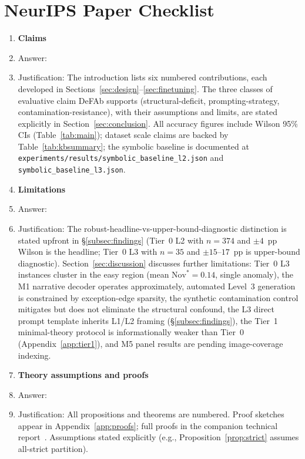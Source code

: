 \documentclass{article}
\theoremstyle{definition}
\newcommand{\Nov}{\mathrm{Nov}}
\begin{document}
\newpage
\section*{NeurIPS Paper Checklist}

\begin{enumerate}

\item {\bf Claims}
    \item[] Answer: \answerYes{}
    \item[] Justification: The introduction lists six numbered contributions, each developed in Sections~\ref{sec:design}--\ref{sec:finetuning}. The three classes of evaluative claim DeFAb supports (structural-deficit, prompting-strategy, contamination-resistance), with their assumptions and limits, are stated explicitly in Section~\ref{sec:conclusion}. All accuracy figures include Wilson 95\% CIs (Table~\ref{tab:main}); dataset scale claims are backed by Table~\ref{tab:kbsummary}; the symbolic baseline is documented at \texttt{experiments/results/symbolic\_baseline\_l2.json} and \texttt{symbolic\_baseline\_l3.json}.

\item {\bf Limitations}
    \item[] Answer: \answerYes{}
    \item[] Justification: The robust-headline-vs-upper-bound-diagnostic distinction is stated upfront in \S\ref{subsec:findings} (Tier~0 L2 with $n=374$ and $\pm 4$~pp Wilson is the headline; Tier~0 L3 with $n=35$ and $\pm 15$--$17$~pp is upper-bound diagnostic). Section~\ref{sec:discussion} discusses further limitations: Tier~0 L3 instances cluster in the easy region (mean $\Nov^* = 0.14$, single anomaly), the M1 narrative decoder operates approximately, automated Level~3 generation is constrained by exception-edge sparsity, the synthetic contamination control mitigates but does not eliminate the structural confound, the L3 direct prompt template inherits L1/L2 framing (\S\ref{subsec:findings}), the Tier~1 minimal-theory protocol is informationally weaker than Tier~0 (Appendix~\ref{app:tier1}), and M5 panel results are pending image-coverage indexing.

\item {\bf Theory assumptions and proofs}
    \item[] Answer: \answerYes{}
    \item[] Justification: All propositions and theorems are numbered. Proof sketches appear in Appendix~\ref{app:proofs}; full proofs in the companion technical report~\citep{cooper2026defab}. Assumptions stated explicitly (e.g., Proposition~\ref{prop:strict} assumes all-strict partition).


\end{enumerate}
\end{document}
